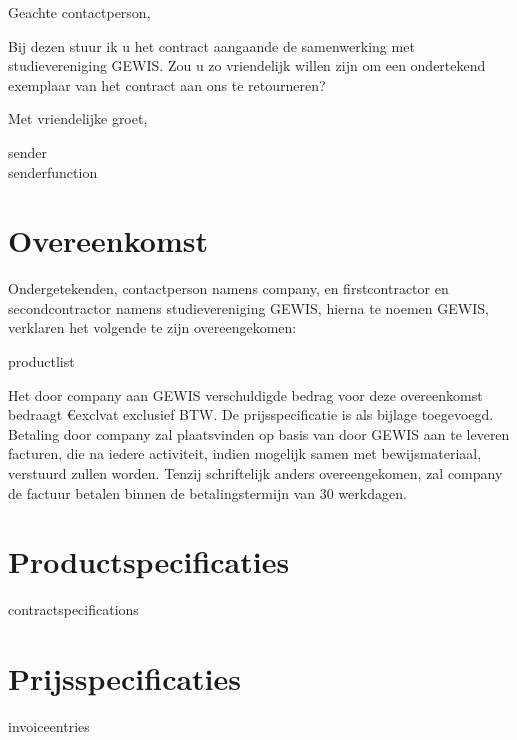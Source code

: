 \documentclass[
printaddress,
dutch
]{GEWISLetter}
\begin{document}
	Geachte {{contactperson}},
	
	Bij dezen stuur ik u het contract aangaande de samenwerking met studievereniging GEWIS. Zou u zo vriendelijk willen zijn om een ondertekend exemplaar van het contract aan ons te retourneren?
	
	Met vriendelijke groet,
	
	{{sender}}\\
	{{senderfunction}}
	
	
	\newpage
	\section{Overeenkomst}
	Ondergetekenden, {{contactperson}} namens {{company}}, en {{firstcontractor}} en {{secondcontractor}} namens studievereniging GEWIS, hierna te noemen GEWIS, verklaren het volgende te zijn overeengekomen:
	\begin{products}
		{{productlist}}
	\end{products}
	
	Het door {{company}} aan GEWIS verschuldigde bedrag voor deze overeenkomst bedraagt \euro{{{exclvat}}} exclusief BTW. De prijsspecificatie is als bijlage toegevoegd. Betaling door {{company}} zal plaatsvinden op basis van door GEWIS aan te leveren facturen, die na iedere activiteit, indien mogelijk samen met bewijsmateriaal, verstuurd zullen worden. Tenzij schriftelijk anders overeengekomen, zal {{company}} de factuur betalen binnen de betalingstermijn van 30 werkdagen.
	\vspace{2em}
	
	
	\signature{{{firstcontractor}}\\{{firstcontractorfunction}}}
	\hfill
	\signature{{{contactperson}}\\{{company}}}
	
	\signature{{{secondcontractor}}\\{{secondcontractorfunction}}}
	
	
	\newpage
	\appendix
	\section{Productspecificaties}
	\begin{specifications}
		{{contractspecifications}}
	\end{specifications}
	
	\section{Prijsspecificaties}
	\begin{invoice}{}
		{{invoiceentries}}
	\end{invoice}
\end{document}
